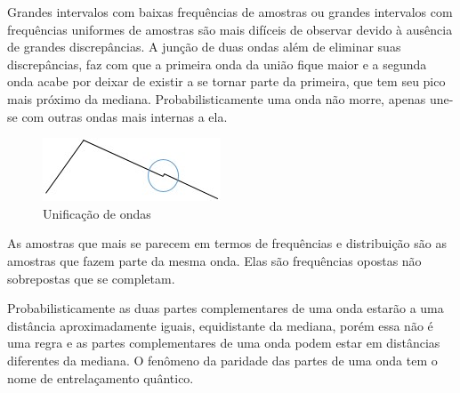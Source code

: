 Grandes intervalos com baixas frequências de amostras ou grandes intervalos com frequências uniformes de amostras são mais difíceis de observar devido à ausência de grandes discrepâncias. A junção de duas ondas além de eliminar suas discrepâncias, faz com que a primeira onda da união fique maior e a segunda onda acabe por deixar de existir a se tornar parte da primeira, que tem seu pico mais próximo da mediana. Probabilisticamente uma onda não morre, apenas une-se com outras ondas mais internas a ela.
	\begin{figure}[H]
	\caption{Unificação de ondas}
	\label{fig:consciousness_uniform_wave}
	\centering
	\includegraphics[scale=1]{sections/images/consciousness_uniform_wave.jpg}
	\end{figure}

As amostras que mais se parecem em termos de frequências e distribuição são as amostras que fazem parte da mesma onda. Elas são frequências opostas não sobrepostas que se completam.

Probabilisticamente as duas partes complementares de uma onda estarão a uma distância aproximadamente iguais, equidistante da mediana, porém essa não é uma regra e as partes complementares de uma onda podem estar em distâncias diferentes da mediana. O fenômeno da paridade das partes de uma onda tem o nome de entrelaçamento quântico.

